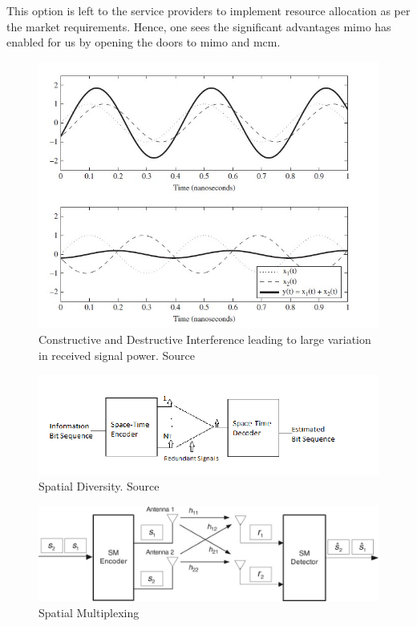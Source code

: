 This option is left to the service providers to implement resource allocation as per the market requirements. Hence, one sees the significant advantages \acrshort{mimo} has enabled for us by opening the doors to \acrshort{mimo} and \acrshort{mcm}.

\begin{figure}[!htbp]
\centering
\includegraphics[scale=1]{Chapter 2/Figures/Interference}
\caption[Constructive and Destructive Interference of Signals]{Constructive and Destructive Interference leading to large variation in received signal power. Source \textcite{Ghosh2010}}
\label{fig:constructive and destructive interference}
\end{figure}

\begin{figure}[!htbp]
\centering
\includegraphics[scale=0.6]{Chapter 2/Figures/Spatial Diversity}
\caption[Spatial Diversity]{Spatial Diversity. Source\textcite{Ghosh2010}}
\label{fig:spatial diversity}
\end{figure}

\begin{figure}[!htbp]
\centering
\includegraphics[scale=0.7]{Chapter 2/Figures/Spatial Multiplexing}
\caption{Spatial Multiplexing}
\label{fig:spatial multiplexing}
\end{figure}


